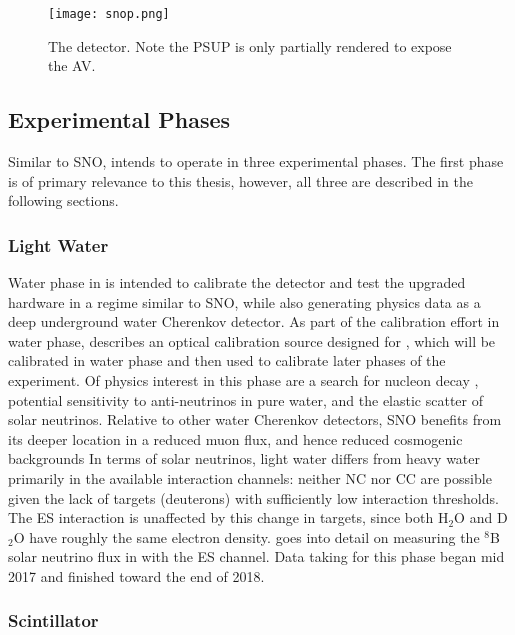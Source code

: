 \begin{figure}
\centering
\texttt{[image: snop.png]}
\caption{\label{fig:snop}The {\snop} detector. Note the PSUP is only partially rendered to expose the AV.}
\end{figure}

\subsection{Experimental Phases}
Similar to SNO, {\snop} intends to operate in three experimental phases.
The first phase is of primary relevance to this thesis, however, all three are described in the following sections.

\subsubsection{Light Water}
Water phase in {\snop} is intended to calibrate the detector and test the upgraded hardware in a regime similar to SNO, while also generating physics data as a deep underground water Cherenkov detector.
As part of the calibration effort in water phase,  describes an optical calibration source designed for {\snop}, which will be calibrated in water phase and then used to calibrate later phases of the experiment.
Of physics interest in this phase are a search for nucleon decay \cite{nucleon_decay}, potential sensitivity to anti-neutrinos in pure water, and the elastic scatter of solar neutrinos.
Relative to other water Cherenkov detectors, SNO benefits from its deeper location in a reduced muon flux, and hence reduced cosmogenic backgrounds
In terms of solar neutrinos, light water differs from heavy water primarily in the available interaction channels: neither NC nor CC are possible given the lack of targets (deuterons) with sufficiently low interaction thresholds.
The ES interaction is unaffected by this change in targets, since both H$_2$O and D$_2$O have roughly the same electron density.
 goes into detail on measuring the $^8$B solar neutrino flux in {\snop} with the ES channel.
Data taking for this phase began mid 2017 and finished toward the end of 2018.

\subsubsection{Scintillator}

